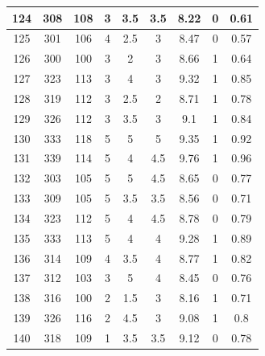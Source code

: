 \documentclass[11pt]{article}
\begin{document}
\begin{appendix}
\begin{longtable}[H]{|c|c|c|c|c|c|c|c|c|}
	124        & 308       & 108         & 3                 & 3.5 & 3.5 & 8.22 & 0        & 0.61            \\ \hline
	125        & 301       & 106         & 4                 & 2.5 & 3   & 8.47 & 0        & 0.57            \\ \hline
	126        & 300       & 100         & 3                 & 2   & 3   & 8.66 & 1        & 0.64            \\ \hline
	127        & 323       & 113         & 3                 & 4   & 3   & 9.32 & 1        & 0.85            \\ \hline
	128        & 319       & 112         & 3                 & 2.5 & 2   & 8.71 & 1        & 0.78            \\ \hline
	129        & 326       & 112         & 3                 & 3.5 & 3   & 9.1  & 1        & 0.84            \\ \hline
	130        & 333       & 118         & 5                 & 5   & 5   & 9.35 & 1        & 0.92            \\ \hline
	131        & 339       & 114         & 5                 & 4   & 4.5 & 9.76 & 1        & 0.96            \\ \hline
	132        & 303       & 105         & 5                 & 5   & 4.5 & 8.65 & 0        & 0.77            \\ \hline
	133        & 309       & 105         & 5                 & 3.5 & 3.5 & 8.56 & 0        & 0.71            \\ \hline
	134        & 323       & 112         & 5                 & 4   & 4.5 & 8.78 & 0        & 0.79            \\ \hline
	135        & 333       & 113         & 5                 & 4   & 4   & 9.28 & 1        & 0.89            \\ \hline
	136        & 314       & 109         & 4                 & 3.5 & 4   & 8.77 & 1        & 0.82            \\ \hline
	137        & 312       & 103         & 3                 & 5   & 4   & 8.45 & 0        & 0.76            \\ \hline
	138        & 316       & 100         & 2                 & 1.5 & 3   & 8.16 & 1        & 0.71            \\ \hline
	139        & 326       & 116         & 2                 & 4.5 & 3   & 9.08 & 1        & 0.8             \\ \hline
	140        & 318       & 109         & 1                 & 3.5 & 3.5 & 9.12 & 0        & 0.78            \\ \hline

\end{longtable}
\end{appendix}
\end{document}
